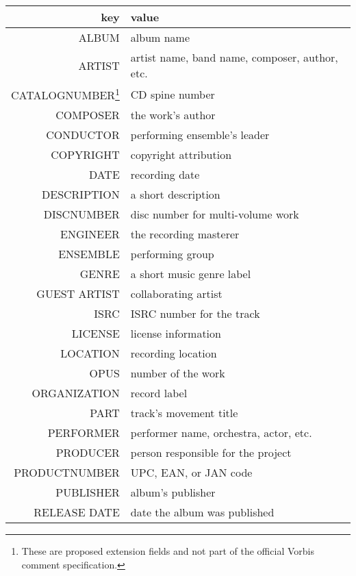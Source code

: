 \begin{minipage}{\linewidth}
\renewcommand\thefootnote{\thempfootnote}
{
\begin{tabular}{|r|l|}
\hline
key & value \\
\hline
ALBUM & album name \\
ARTIST & artist name, band name, composer, author, etc. \\
CATALOGNUMBER\footnote{These are proposed extension fields and not part of the official Vorbis comment specification.} & CD spine number \\
COMPOSER\footnotemark[\value{mpfootnote}] & the work's author \\
CONDUCTOR\footnotemark[\value{mpfootnote}] & performing ensemble's leader \\
COPYRIGHT & copyright attribution \\
DATE & recording date \\
DESCRIPTION & a short description \\
DISCNUMBER\footnotemark[\value{mpfootnote}] & disc number for multi-volume work \\
ENGINEER\footnotemark[\value{mpfootnote}] & the recording masterer \\
ENSEMBLE\footnotemark[\value{mpfootnote}] & performing group \\
GENRE & a short music genre label \\
GUEST ARTIST\footnotemark[\value{mpfootnote}] & collaborating artist \\
ISRC & ISRC number for the track \\
LICENSE & license information \\
LOCATION & recording location \\
OPUS\footnotemark[\value{mpfootnote}] & number of the work \\
ORGANIZATION & record label \\
PART\footnotemark[\value{mpfootnote}] & track's movement title \\
PERFORMER & performer name, orchestra, actor, etc. \\
PRODUCER\footnotemark[\value{mpfootnote}] & person responsible for the project \\
PRODUCTNUMBER\footnotemark[\value{mpfootnote}] & UPC, EAN, or JAN code \\
PUBLISHER\footnotemark[\value{mpfootnote}] & album's publisher \\
RELEASE DATE\footnotemark[\value{mpfootnote}] & date the album was published \\

\end{tabular}}
\end{minipage}

